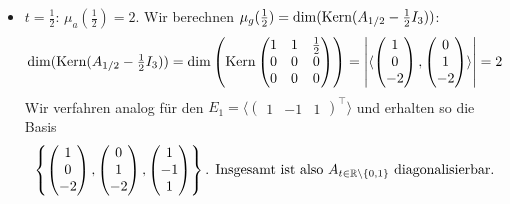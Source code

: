 \begin{enumerate}
\begin{itemize}
		 \item \( t = \tfrac{1}{2} \): \( \mu_a(\tfrac{1}{2}) = 2 \). Wir berechnen \( \mu_g(\tfrac{1}{2}) = \dim(\text{Kern}(A_{1/2} - \tfrac{1}{2}I_3)) \):
		 \begin{equation*}
		 	 \dim(\text{Kern}(A_{1/2} - \tfrac{1}{2}I_3)) = \dim \left( \text{Kern}\begin{pmatrix}
		 	 	1 & 1 & \tfrac{1}{2} \\
		 	 	0 & 0 & 0 \\
		 	 	0 & 0 & 0
		 	 \end{pmatrix} \right) = \left| \langle \begin{pmatrix}
		 	 	1 \\ 0 \\ -2
		 	 \end{pmatrix}, \begin{pmatrix}
		 	 	0 \\ 1 \\ -2
		 	 \end{pmatrix} \rangle \right| = 2
		 \end{equation*}
		 Wir verfahren analog für den \( E_1 = \langle \begin{pmatrix}
		 	1 & -1 & 1
		 \end{pmatrix}^\top \rangle \) und erhalten so die Basis
		 \begin{equation*}
		 	\left\{ \begin{pmatrix}
		 		1 \\ 0 \\ -2
		 	\end{pmatrix}, \begin{pmatrix}
		 		0 \\ 1 \\ -2
		 	\end{pmatrix}, \begin{pmatrix}
		 		1 \\ -1 \\ 1
		 	\end{pmatrix} \right\}\text{. Insgesamt ist also \( A_{t \in \mathbb{R}\setminus \{ 0, 1 \} } \) diagonalisierbar.}
		 \end{equation*}
	\end{itemize}
\end{enumerate}